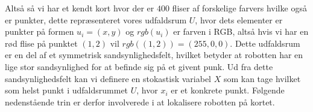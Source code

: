 \documentclass[../../SRP.tex]{subfiles}
\begin{document}

\begin{center}
\end{center}

Altså så vi har et kendt kort hvor der er $400$ fliser af forskelige farvers hvilke også er punkter, dette repræsenteret vores udfaldsrum $U$, hvor dets elementer er punkter på formen $u_i = (x,y)$ og $rgb(u_i)$ er farven i RGB, altså hvis vi har en rød flise på punktet $(1,2)$ vil $rgb((1,2)) = (255,0,0)$. Dette udfaldsrum er en del af et symmetrisk sandsynlighedsfelt, hvilket betyder at robotten har en lige stor sandsynlighed for at befinde sig på et givent punk. Ud fra dette sandsynlighedsfelt kan vi definere en stokastisk variabel $X$ som kan tage hvilket som helst punkt i udfaldsrummet $U$, hvor $x_i$ er et konkrete punkt. Følgende nedenstående trin er derfor involverede i at lokalisere robotten på kortet.
\end{document}

